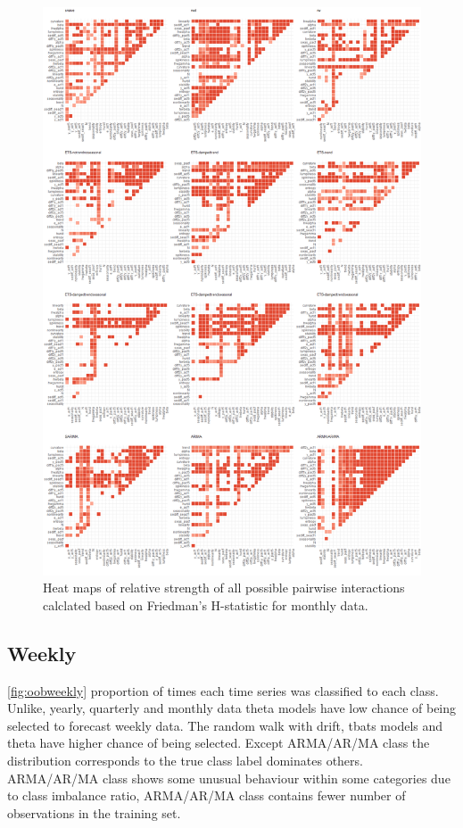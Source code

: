 \documentclass[11pt,a4paper,]{article}
\begin{document}
\begin{figure}
\centering
\includegraphics{figures/friedmanM-1.png}
\caption{\label{fig:friedmanM}Heat maps of relative strength of all possible
pairwise interactions calclated based on Friedman's H-statistic for
monthly data.}
\end{figure}

\subsection{Weekly}\label{weekly}

\autoref{fig:oobweekly} proportion of times each time series was
classified to each class. Unlike, yearly, quarterly and monthly data
theta models have low chance of being selected to forecast weekly data.
The random walk with drift, tbats models and theta have higher chance of
being selected. Except ARMA/AR/MA class the distribution corresponds to
the true class label dominates others. ARMA/AR/MA class shows some
unusual behaviour within some categories due to class imbalance ratio,
ARMA/AR/MA class contains fewer number of observations in the training
set.
\end{document}
